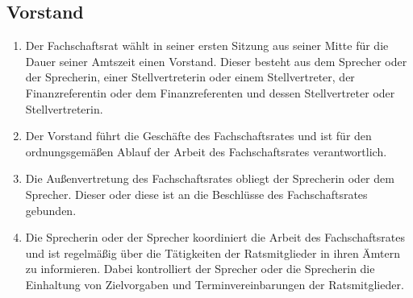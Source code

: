 \subsection{Vorstand}
\begin{enumerate}
\item Der Fachschaftsrat wählt in seiner ersten Sitzung aus seiner Mitte für die Dauer seiner Amtszeit einen Vorstand. Dieser besteht aus dem Sprecher oder der Sprecherin, einer Stellvertreterin oder einem Stellvertreter, der Finanzreferentin oder dem Finanzreferenten und dessen Stellvertreter oder Stellvertreterin.
\item Der Vorstand führt die Geschäfte des Fachschaftsrates und ist für den ordnungsgemäßen Ablauf der Arbeit des Fachschaftsrates verantwortlich.
\item Die Außenvertretung des Fachschaftsrates obliegt der Sprecherin oder dem Sprecher. Dieser oder diese ist an die Beschlüsse des Fachschaftsrates gebunden.
\item Die Sprecherin oder der Sprecher koordiniert die Arbeit des Fachschaftsrates und ist regelmäßig über die Tätigkeiten der Ratsmitglieder in ihren Ämtern zu informieren. Dabei kontrolliert der Sprecher oder die Sprecherin die Einhaltung von Zielvorgaben und Terminvereinbarungen der Ratsmitglieder.
\end{enumerate}

